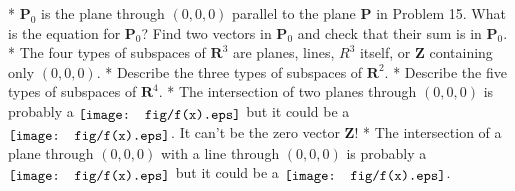 * \(\mathbf{P}_{0}\) is the plane through \((0,0,0)\) parallel to the plane \(\mathbf{P}\) in Problem 15. What is the equation for \(\mathbf{P}_{0}\)? Find two vectors in \(\mathbf{P}_{0}\) and check that their sum is in \(\mathbf{P}_{0}\).
* The four types of subspaces of \(\mathbf{R}^{3}\) are planes, lines, \(R^{3}\) itself, or \(\mathbf{Z}\) containing only \((0,0,0)\).
* Describe the three types of subspaces of \(\mathbf{R}^{2}\).
* Describe the five types of subspaces of \(\mathbf{R}^{4}\).
* The intersection of two planes through \((0,0,0)\) is probably a \(\raisebox{-1.5pt}{\texttt{[image: fig/f(x).eps]}}\) but it could be a \(\raisebox{-1.5pt}{\texttt{[image: fig/f(x).eps]}}\). It can't be the zero vector \(\mathbf{Z}\)!
* The intersection of a plane through \((0,0,0)\) with a line through \((0,0,0)\) is probably a \(\raisebox{-1.5pt}{\texttt{[image: fig/f(x).eps]}}\) but it could be a \(\raisebox{-1.5pt}{\texttt{[image: fig/f(x).eps]}}\).
 
